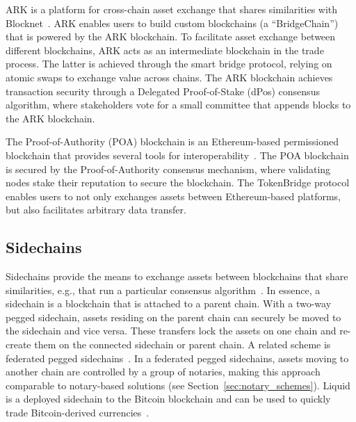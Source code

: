 ARK is a platform for cross-chain asset exchange that shares similarities with Blocknet~\cite{ark2019whitepaper}.
ARK enables users to build custom blockchains (a \enquote{BridgeChain}) that is powered by the ARK blockchain.
To facilitate asset exchange between different blockchains, ARK acts as an intermediate blockchain in the trade process.
The latter is achieved through the smart bridge protocol, relying on atomic swaps to exchange value across chains.
The ARK blockchain achieves transaction security through a Delegated Proof-of-Stake (dPos) consensus algorithm, where stakeholders vote for a small committee that appends blocks to the ARK blockchain.

The Proof-of-Authority (POA) blockchain is an Ethereum-based permissioned blockchain that provides several tools for interoperability~\cite{poa2018whitepaper}.
The POA blockchain is secured by the Proof-of-Authority consensus mechanism, where validating nodes stake their reputation to secure the blockchain.
The TokenBridge protocol enables users to not only exchanges assets between Ethereum-based platforms, but also facilitates arbitrary data transfer.

\subsection{Sidechains}
Sidechains provide the means to exchange assets between blockchains that share similarities, e.g., that run a particular consensus algorithm~\cite{singh2020sidechain,back2014enabling}.
In essence, a sidechain is a blockchain that is attached to a parent chain.
With a two-way pegged sidechain, assets residing on the parent chain can securely be moved to the sidechain and vice versa.
These transfers lock the assets on one chain and re-create them on the connected sidechain or parent chain.
A related scheme is federated pegged sidechains~\cite{dilley2016strong}.
In a federated pegged sidechains, assets moving to another chain are controlled by a group of notaries, making this approach comparable to notary-based solutions (see Section~\ref{sec:notary_schemes}).
Liquid is a deployed sidechain to the Bitcoin blockchain and can be used to quickly trade Bitcoin-derived currencies~\cite{dilley2016strong}.

